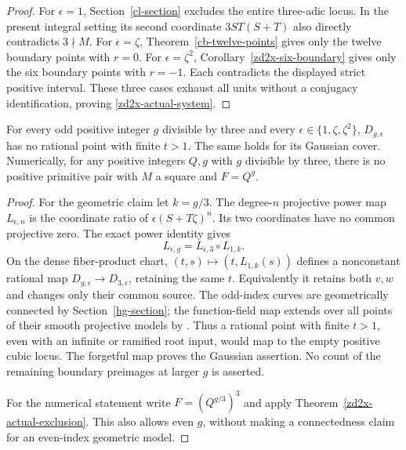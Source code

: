 \begin{proof}
For \(\epsilon=1\), Section~\ref{cl-section}
excludes the entire three-adic locus. In the present
integral setting its second coordinate
\(3ST(S+T)\) also directly contradicts \(3\nmid M\).
For \(\epsilon=\zeta\), Theorem~\ref{cb-twelve-points}
gives only the twelve boundary points with \(r=0\).
For \(\epsilon=\zeta^2\),
Corollary~\ref{zd2x-six-boundary} gives only the six
boundary points with \(r=-1\).
Each contradicts the displayed strict positive
interval. These three cases exhaust all units
without a conjugacy identification, proving
\eqref{zd2x-actual-system}.
\end{proof}

\begin{corollary}
\label{zd2x-propagation}
For every odd positive integer \(g\) divisible by
three and every \(\epsilon\in\{1,\zeta,\zeta^2\}\),
\(D_{g,\epsilon}\) has no rational point with finite
\(t>1\). The same holds for its Gaussian cover.
Numerically, for any positive integers \(Q,g\) with
\(g\) divisible by three, there is no positive primitive pair with
\(M\) a square and \(F=Q^g\).
\end{corollary}
\begin{proof}
For the geometric claim let \(k=g/3\). The degree-\(n\)
projective power map \(L_{\epsilon,n}\) is the
coordinate ratio of \(\epsilon(S+T\zeta)^n\).
Its two coordinates have no common projective zero.
The exact power identity gives
\[
 L_{\epsilon,g}=L_{\epsilon,3}\circ L_{1,k}.
\]
On the dense fiber-product chart,
\((t,s)\mapsto(t,L_{1,k}(s))\) defines a
nonconstant rational map \(D_{g,\epsilon}\to
D_{3,\epsilon}\), retaining the same \(t\).
Equivalently it retains both \(v,w\) and changes
only their common source. The odd-index curves
are geometrically connected by
Section~\ref{hg-section}; the function-field map
extends over all points of their smooth
projective models by
\cite[Lemma~53.2.2 and Theorem~53.2.6]{StacksCurves2026}.
Thus a rational point with finite \(t>1\), even
with an infinite or ramified root input, would
map to the empty positive cubic locus. The
forgetful map proves the Gaussian assertion.
No count of the remaining boundary preimages
at larger \(g\) is asserted.

For the numerical statement write
\(F=(Q^{g/3})^3\) and apply
Theorem~\ref{zd2x-actual-exclusion}. This also
allows even \(g\), without making a connectedness
claim for an even-index geometric model.
\end{proof}

